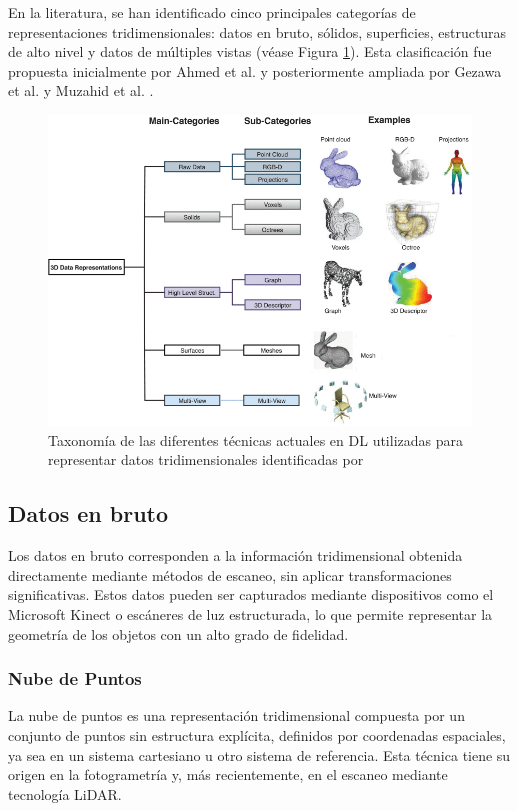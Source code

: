 En la literatura, se han identificado cinco principales categorías de representaciones tridimensionales: datos en bruto, sólidos, superficies, estructuras de alto nivel y datos de múltiples vistas (véase Figura \ref{fig:3dTaxonomy}). Esta clasificación fue propuesta inicialmente por Ahmed et al. \cite{ahmed_survey_2019} y posteriormente ampliada por Gezawa et al. \cite{gezawa_review_2020} y Muzahid et al. \cite{muzahid_deep_2024}.

\begin{figure}[h]
    \centering
    \includegraphics[width=\linewidth]{figures/2_theory/3Dtaxonomy.png}
    \caption[Taxonomía de las representaciones 3D para Deep Learning]{Taxonomía de las diferentes técnicas actuales en DL utilizadas para representar datos tridimensionales identificadas por \cite{gezawa_review_2020}}
    \label{fig:3dTaxonomy}
\end{figure}

\subsection{Datos en bruto}
Los datos en bruto corresponden a la información tridimensional obtenida directamente mediante métodos de escaneo, sin aplicar transformaciones significativas. Estos datos pueden ser capturados mediante dispositivos como el Microsoft Kinect o escáneres de luz estructurada, lo que permite representar la geometría de los objetos con un alto grado de fidelidad.

\subsubsection{Nube de Puntos}
La nube de puntos es una representación tridimensional compuesta por un conjunto de puntos sin estructura explícita, definidos por coordenadas espaciales, ya sea en un sistema cartesiano u otro sistema de referencia. Esta técnica tiene su origen en la fotogrametría y, más recientemente, en el escaneo mediante tecnología LiDAR.

